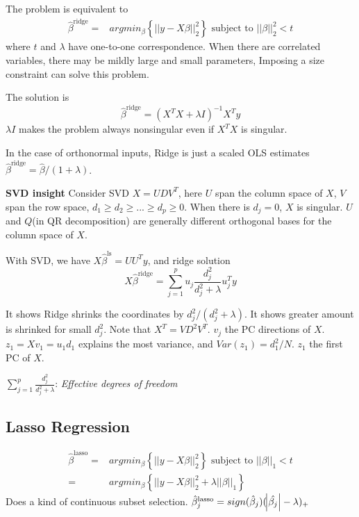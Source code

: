 The problem is equivalent to
\begin{align*}
\hat{\beta}^{\text{ridge}}=&
argmin_{\beta}\left\{||y-X\beta||_2^2\right\} \text{ subject to }||\beta||_2^2<t
\end{align*}
where $t$ and $\lambda$ have one-to-one correspondence. 
When there are correlated variables, there may be mildly large and small parameters, 
Imposing a size constraint can solve this problem. 

The solution is
\begin{equation*}
\hat{\beta}^{\text{ridge}}=(X^TX+\lambda I)^{-1}X^Ty
\end{equation*}
$\lambda I$ makes the problem always nonsingular even if $X^TX$ is singular. 

In the case of orthonormal inputs, Ridge is just a scaled OLS estimates 
$\hat{\beta}^{\text{ridge}}=\hat{\beta}/(1+\lambda)$. 

\textbf{SVD insight}
Consider SVD $X=UDV^T$, here $U$ span the column space of $X$, $V$ span the row 
space, $d_1\ge d_2\ge...\ge d_p\ge0$. When there is $d_j=0$, $X$ is singular. 
$U$ and $Q$(in QR decomposition) are generally different orthogonal bases for 
the column space of $X$. 

With SVD, we have $X\hat{\beta}^{\text{ls}}=UU^Ty$, and ridge solution
\begin{equation*}
X\hat{\beta}^{\text{ridge}}=\sum_{j=1}^p u_j\frac{d_j^2}{d_j^2+\lambda}u_j^Ty
\end{equation*}

It shows Ridge shrinks the coordinates by $d_j^2/(d_j^2+\lambda)$. It shows 
greater amount is shrinked for small $d_j^2$. Note that $X^T=VD^2V^T$. $v_j$ the 
PC directions of $X$. $z_1=Xv_1=u_1d_1$ explains the most variance, and 
$Var(z_1)=d_1^2/N$. $z_1$ the first PC of $X$. 

$\displaystyle \sum_{j=1}^p\frac{d_j^2}{d_j^2+\lambda}$: \textit{Effective 
degrees of freedom}

\subsection{Lasso Regression}
\begin{align*}
    \hat{\beta}^{\text{lasso}}=&
    argmin_{\beta}\left\{||y-X\beta||_2^2\right\} \text{ subject to }
    ||\beta||_1<t\\
    =&argmin_{\beta}\left\{||y-X\beta||_2^2+\lambda ||\beta||_1\right\}
\end{align*}
Does a kind of continuous subset selection. 
$\hat{\beta}^{\text{lasso}}_j=sign(\hat{\beta}_j)(\abs{\hat{\beta_j}}-\lambda)_+$
